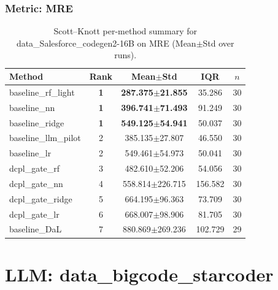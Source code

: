 \subsubsection*{Metric: MRE}
\begin{table}[H]
\centering
\scriptsize
\setlength{\tabcolsep}{4pt}
\renewcommand{\arraystretch}{1.1}
\caption{Scott--Knott per-method summary for data\_Salesforce\_codegen2-16B on MRE (Mean$\pm$Std over runs).}
\label{tab:sk_data_Salesforce_codegen2-16B_MRE}
\begin{tabular}{l|c|c|c|c}
\hline
\textbf{Method} & \textbf{Rank} & \textbf{Mean$\pm$Std} & \textbf{IQR} & \textbf{$n$} \\
\hline
\rowcolor{red!15} baseline\_rf\_light & \textbf{1} & \textbf{287.375$\pm$21.855} & 35.286 & 30 \\
\rowcolor{red!15} baseline\_nn & \textbf{1} & \textbf{396.741$\pm$71.493} & 91.249 & 30 \\
\rowcolor{red!15} baseline\_ridge & \textbf{1} & \textbf{549.125$\pm$54.941} & 50.037 & 30 \\
baseline\_llm\_pilot & 2 & 385.135$\pm$27.807 & 46.550 & 30 \\
baseline\_lr & 2 & 549.461$\pm$54.973 & 50.041 & 30 \\
dcpl\_gate\_rf & 3 & 482.610$\pm$52.206 & 54.056 & 30 \\
dcpl\_gate\_nn & 4 & 558.814$\pm$226.715 & 156.582 & 30 \\
dcpl\_gate\_ridge & 5 & 664.195$\pm$96.363 & 73.709 & 30 \\
dcpl\_gate\_lr & 6 & 668.007$\pm$98.906 & 81.705 & 30 \\
baseline\_DaL & 7 & 880.869$\pm$269.236 & 102.729 & 29 \\
\hline
\end{tabular}
\end{table}


\newpage

\section*{LLM: data\_bigcode\_starcoder}

